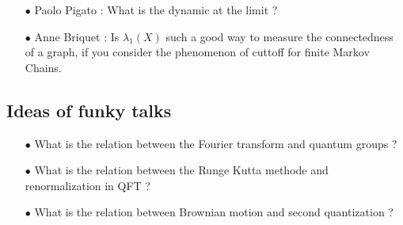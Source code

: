 \begin{itemize}
\item[$\bullet$] Paolo Pigato : What is the dynamic at the limit ?
\item[$\bullet$] Anne Briquet : Is $\lambda_1(X)$ such a good way to measure the connectedness of a graph, if you consider the phenomenon of cuttoff for finite Markov Chains.
\end{itemize} 

\subsection{Ideas of funky talks}

\begin{itemize}
\item[$\bullet$] What is the relation between the Fourier transform and quantum groups ?
\item[$\bullet$] What is the relation between the Runge Kutta methode and renormalization in QFT ? 
\item[$\bullet$] What is the relation between Brownian motion and second quantization ?
\end{itemize} 
